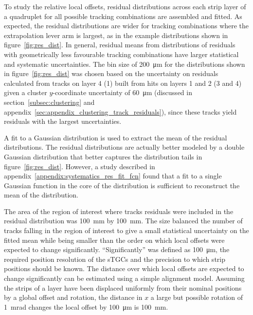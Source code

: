 To study the relative local offsets, residual distributions across each strip layer of a quadruplet for all possible tracking combinations are assembled and fitted. As expected, the residual distributions are wider for tracking combinations where the extrapolation lever arm is largest, as in the example distributions shown in figure~\ref{fig:res_dist}. In general, residual means from distributions of residuals with geometrically less favourable tracking combinations have larger statistical and systematic uncertainties. The bin size of \SI{200}{\micro\meter} for the distributions shown in figure~\ref{fig:res_dist} was chosen based on the uncertainty on residuals calculated from tracks on layer 4 (1) built from hits on layers 1 and 2 (3 and 4) given a cluster $y$-coordinate uncertainty of \SI{60}{\micro\meter} (discussed in section~\ref{subsec:clustering} and appendix~\ref{sec:appendix_clustering_track_residuals}), since these tracks yield residuals with the largest uncertainties.

A fit to a Gaussian distribution is used to extract the mean of the residual distributions. The residual distributions are actually better modeled by a double Gaussian distribution that better captures the distribution tails in figure~\ref{fig:res_dist}. However, a study described in appendix~\ref{appendix:systematics_res_fit_fcn} found that a fit to a single Gaussian function in the core of the distribution is sufficient to reconstruct the mean of the distribution.

The area of the region of interest where tracks residuals were included in the residual distribution was \SI{100}{\milli\meter} by \SI{100}{\milli\meter}. The size balanced the number of tracks falling in the region of interest to give a small statistical uncertainty on the fitted mean while being smaller than the order on which local offsets were expected to change significantly. ``Significantly'' was defined as \SI{100}{\micro\meter}, the required position resolution of the sTGCs and the precision to which strip positions should be known. The distance over which local offsets are expected to change significantly can be estimated using a simple alignment model. Assuming the strips of a layer have been displaced uniformly from their nominal positions by a global offset and rotation, the distance in $x$ a large but possible rotation of \SI{1}{mrad} changes the local offset by \SI{100}{\micro\meter} is \SI{100}{mm}.

